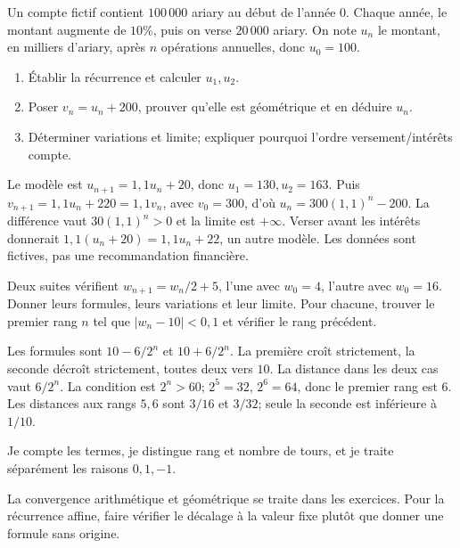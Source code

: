\label{t11s-c12-p01}
Un compte fictif contient $100\,000$ ariary au début de l’année $0$. Chaque année, le montant augmente de $10\%$, puis on verse $20\,000$ ariary. On note $u_n$ le montant, en milliers d’ariary, après $n$ opérations annuelles, donc $u_0=100$.
\begin{enumerate}
\item Établir la récurrence et calculer $u_1,u_2$.
\item Poser $v_n=u_n+200$, prouver qu’elle est géométrique et en déduire $u_n$.
\item Déterminer variations et limite; expliquer pourquoi l’ordre versement/intérêts compte.
\end{enumerate}
\begin{corrige}\label{sol-t11s-c12-p01}
Le modèle est $u_{n+1}=1{,}1u_n+20$, donc $u_1=130,u_2=163$. Puis $v_{n+1}=1{,}1u_n+220=1{,}1v_n$, avec $v_0=300$, d’où $u_n=300(1{,}1)^n-200$. La différence vaut $30(1{,}1)^n>0$ et la limite est $+\infty$. Verser avant les intérêts donnerait $1{,}1(u_n+20)=1{,}1u_n+22$, un autre modèle. Les données sont fictives, pas une recommandation financière.
\end{corrige}
\label{t11s-c12-p02}
Deux suites vérifient $w_{n+1}=w_n/2+5$, l’une avec $w_0=4$, l’autre avec $w_0=16$. Donner leurs formules, leurs variations et leur limite. Pour chacune, trouver le premier rang $n$ tel que $|w_n-10|<0{,}1$ et vérifier le rang précédent.
\begin{corrige}\label{sol-t11s-c12-p02}
Les formules sont $10-6/2^n$ et $10+6/2^n$. La première croît strictement, la seconde décroît strictement, toutes deux vers $10$. La distance dans les deux cas vaut $6/2^n$. La condition est $2^n>60$; $2^5=32$, $2^6=64$, donc le premier rang est $6$. Les distances aux rangs $5,6$ sont $3/16$ et $3/32$; seule la seconde est inférieure à $1/10$.
\end{corrige}

\begin{jemeteste}Je compte les termes, je distingue rang et nombre de tours, et je traite séparément les raisons $0,1,-1$.\end{jemeteste}
\begin{notepourlaclasse}La convergence arithmétique et géométrique se traite dans les exercices. Pour la récurrence affine, faire vérifier le décalage à la valeur fixe plutôt que donner une formule sans origine.\end{notepourlaclasse}
